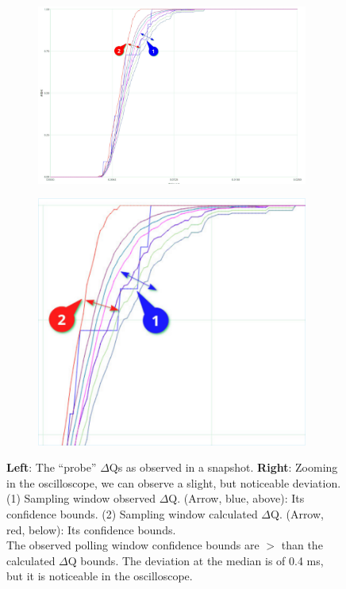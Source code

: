        \begin{figure}[H]
            \centering
            \begin{subfigure}{.5\textwidth}
                \centering
                \includegraphics[width=0.98\textwidth]{img/overload_2/150_probe2.pdf}
                \label{fig:ovuvv}
            \end{subfigure}%
            \begin{subfigure}{.5\textwidth}
                \centering
                \includegraphics[width =0.98\textwidth]{img/overload_2/150_probe2zoom_cropped.pdf}
                \label{fig:ovovv}
            \end{subfigure}
            \caption{\textbf{Left}: The ``probe'' $\Delta$Qs as observed in a snapshot. \textbf{Right}: Zooming in the oscilloscope, we can observe a slight, but noticeable deviation. (1) Sampling window observed $\Delta$Q. (Arrow, blue, above): Its confidence bounds. (2) Sampling window calculated $\Delta$Q. (Arrow, red, below): Its confidence bounds. \\ The observed polling window confidence bounds are $>$ than the calculated $\Delta$Q bounds. The deviation at the median is of 0.4 ms, but it is noticeable in the oscilloscope.}
            \label{fig:avavv} 
        \end{figure}
       
